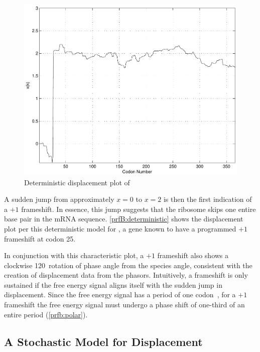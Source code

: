 \documentclass[12pt, draft]{article}
\numberwithin{equation}{section}
\begin{document}
\begin{figure}
  \centering
  \caption{Deterministic displacement plot of \prfB}
  \label{prfB:deterministic}
  \includegraphics[scale=0.7]{prfB/deterministic.pdf}
\end{figure}

A sudden jump from approximately $x = 0$ to $x = 2$ is then the first indication of a $+1$ frameshift.
In essence, this jump suggests that the ribosome skips one entire base pair in the mRNA sequence.
\autoref{prfB:deterministic} shows the displacement plot per this deterministic model for \prfB, 
a gene known to have a programmed $+1$ frameshift at codon 25.

In conjunction with this characteristic plot, a $+1$ frameshift also shows a clockwise 120\degree\
rotation of phase angle from the species angle, consistent with the creation of displacement data from the phasors.
Intuitively, a frameshift is only sustained if the free energy signal aligns itself with the sudden jump in displacement.
Since the free energy signal has a period of one codon~\cite{lalit:mechanics}, for a $+1$ frameshift the free energy signal
must undergo a phase shift of one-third of an entire period (\autoref{prfb:polar}).

\subsection{A Stochastic Model for Displacement}
\label{stochastic}

\end{document}
